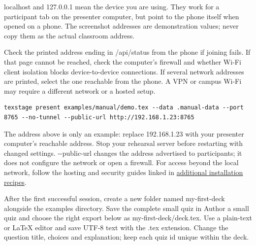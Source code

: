 \documentclass[a4paper,11pt]{article}
\begin{document}
localhost and 127.\allowbreak{}0.\allowbreak{}0.\allowbreak{}1 mean the device you are using.\allowbreak{} They work for a participant tab on the presenter computer, but point to the phone itself when opened on a phone.\allowbreak{} The screenshot addresses are demonstration values; never copy them as the actual classroom address.\par

Check the printed address ending in /\allowbreak{}api/\allowbreak{}status from the phone if joining fails.\allowbreak{} If that page cannot be reached, check the computer's firewall and whether Wi-\allowbreak{}Fi client isolation blocks device-\allowbreak{}to-\allowbreak{}device connections.\allowbreak{} If several network addresses are printed, select the one reachable from the phone.\allowbreak{} A VPN or campus Wi-\allowbreak{}Fi may require a different network or a hosted setup.\par

\par\noindent\begin{minipage}{\linewidth}
\begin{Verbatim}
texstage present examples/manual/demo.tex --data .manual-data --port 8765 --no-tunnel --public-url http://192.168.1.23:8765
\end{Verbatim}
\end{minipage}\par\smallskip

The address above is only an example: replace 192.\allowbreak{}168.\allowbreak{}1.\allowbreak{}23 with your presenter computer's reachable address.\allowbreak{} Stop your rehearsal server before restarting with changed settings.\allowbreak{} -\allowbreak{}-\allowbreak{}public-\allowbreak{}url changes the address advertised to participants; it does not configure the network or open a firewall.\allowbreak{} For access beyond the local network, follow the hosting and security guides linked in \href{\manualdocroot installation-advanced.md}{additional installation recipes}.\par

\label{sec:make-the-demonstration-your-own}
After the first successful session, create a new folder named my-\allowbreak{}first-\allowbreak{}deck alongside the examples directory.\allowbreak{} Save the complete small quiz in Author a small quiz and choose the right export below as my-\allowbreak{}first-\allowbreak{}deck/\allowbreak{}deck.\allowbreak{}tex.\allowbreak{} Use a plain-\allowbreak{}text or LaTeX editor and save UTF-\allowbreak{}8 text with the .\allowbreak{}tex extension.\allowbreak{} Change the question title, choices and explanation; keep each quiz id unique within the deck.\par
\end{document}
